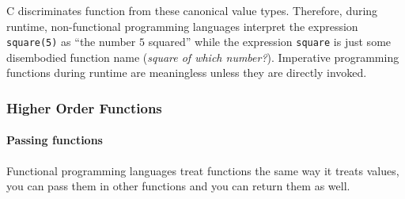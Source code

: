 \begin{Shaded}
\begin{Highlighting}[]
\OperatorTok{*}\OperatorTok{(}\OperatorTok{*,}\OperatorTok{,}\OperatorTok{)\{}
 \OperatorTok{(}\OperatorTok{=}\OperatorTok{;}\OperatorTok{\textless{}}\OperatorTok{;}\OperatorTok{++)\{}
\OperatorTok{[}\OperatorTok{]+}\OperatorTok{;}
 \OperatorTok{\}}
 \OperatorTok{;}
\OperatorTok{\}}
\end{Highlighting}
\end{Shaded}

C discriminates function from these canonical value types. Therefore,
during runtime, non-functional programming languages interpret the
expression \texttt{square(5)} as ``the number \(5\) squared'' while the
expression \texttt{square} is just some disembodied function name
(\emph{square of which number?}). Imperative programming functions
during runtime are meaningless unless they are directly invoked.

\subsubsection{Higher Order
Functions}\label{functional-programming-paradigm.md__higher-order-functions}

\paragraph{Passing
functions}\label{functional-programming-paradigm.md__passing-functions}

Functional programming languages treat functions the same way it treats
values, you can pass them in other functions and you can return them as
well.

\begin{Shaded}
\begin{Highlighting}[]
  \OtherTok{{-}\textgreater{}} 
\OtherTok{=}\OperatorTok{+} 

 \OtherTok{{-}\textgreater{}} 
\OtherTok{=}\OperatorTok{{-}} 

\NormalTok{ (}\OtherTok{{-}\textgreater{}} \NormalTok{) }\OtherTok{{-}\textgreater{}}  \OtherTok{{-}\textgreater{}} 
\OtherTok{=}
\end{Highlighting}
\end{Shaded}


